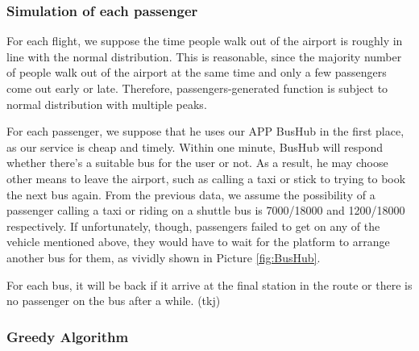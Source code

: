 \documentclass{mcmthesis}
\begin{document}
\subsubsection{Simulation of each passenger}

For each flight, we suppose the time people walk out of the airport is roughly in line with the normal distribution. This is reasonable, since the majority number of people walk out of the airport at the same time and only a few passengers come out early or late. Therefore, passengers-generated function is subject to normal distribution with multiple peaks.

For each passenger, we suppose that he uses our APP BusHub in the first place, as our service is cheap and timely. Within one minute, BusHub will respond whether there's a suitable bus for the user or not. As a result, he may choose other means to leave the airport, such as calling a taxi or stick to trying to book the next bus again. From the previous data, we assume the possibility of a passenger calling a taxi or riding on a shuttle bus is 7000/18000 and 1200/18000 respectively. If unfortunately, though, passengers failed to get on any of the vehicle mentioned above, they would have to wait for the platform to arrange another bus for them, as vividly shown in Picture \ref{fig:BusHub}.

For each bus, it will be back if it arrive at the final station in the route or there is no passenger on the bus after a while. (tkj)

\subsubsection{Greedy Algorithm}


\end{document}
